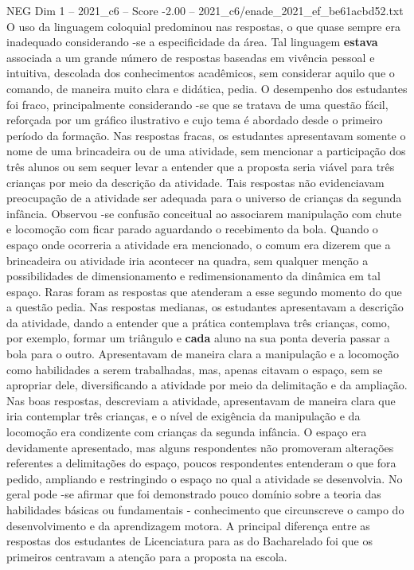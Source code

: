 \begin{textsample}{NEG Dim 1 – 2021\_c6 – Score -2.00 – 2021\_c6/enade\_2021\_ef\_be61acbd52.txt}
O uso da linguagem coloquial predominou nas respostas, o que quase sempre era inadequado considerando -se a especificidade da área.
Tal linguagem \textbf{estava} associada a um grande número de respostas baseadas em vivência pessoal e intuitiva, descolada dos conhecimentos acadêmicos, sem considerar aquilo que o comando, de maneira muito clara e didática, pedia.
O desempenho dos estudantes foi fraco, principalmente considerando -se que se tratava de uma questão fácil, reforçada por um gráfico ilustrativo e cujo tema é abordado desde o primeiro período da formação.
Nas respostas fracas, os estudantes apresentavam somente o nome de uma brincadeira ou de uma atividade, sem mencionar a participação dos três alunos ou sem sequer levar a entender que a proposta seria viável para três crianças por meio da descrição da atividade.
Tais respostas não evidenciavam preocupação de a atividade ser adequada para o universo de crianças da segunda infância.
Observou -se confusão conceitual ao associarem manipulação com chute e locomoção com ficar parado aguardando o recebimento da bola.
Quando o espaço onde ocorreria a atividade era mencionado, o comum era dizerem que a brincadeira ou atividade iria acontecer na quadra, sem qualquer menção a possibilidades de dimensionamento e redimensionamento da dinâmica em tal espaço.
Raras foram as respostas que atenderam a esse segundo momento do que a questão pedia.
Nas respostas medianas, os estudantes apresentavam a descrição da atividade, dando a entender que a prática contemplava três crianças, como, por exemplo, formar um triângulo e \textbf{cada} aluno na sua ponta deveria passar a bola para o outro.
Apresentavam de maneira clara a manipulação e a locomoção como habilidades a serem trabalhadas, mas, apenas citavam o espaço, sem se apropriar dele, diversificando a atividade por meio da delimitação e da ampliação.
Nas boas respostas, descreviam a atividade, apresentavam de maneira clara que iria contemplar três crianças, e o nível de exigência da manipulação e da locomoção era condizente com crianças da segunda infância.
O espaço era devidamente apresentado, mas alguns respondentes não promoveram alterações referentes a delimitações do espaço, poucos respondentes entenderam o que fora pedido, ampliando e restringindo o espaço no qual a atividade se desenvolvia.
No geral pode -se afirmar que foi demonstrado pouco domínio sobre a teoria das habilidades básicas ou fundamentais - conhecimento que circunscreve o campo do desenvolvimento e da aprendizagem motora.
A principal diferença entre as respostas dos estudantes de Licenciatura para as do Bacharelado foi que os primeiros centravam a atenção para a proposta na escola.

\end{textsample}
